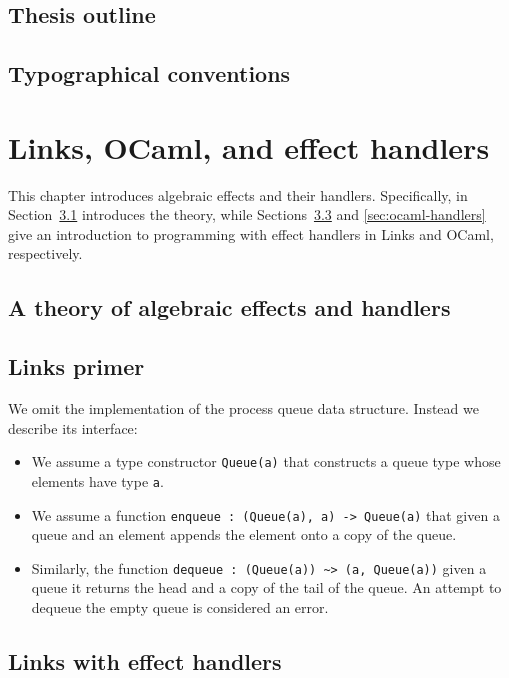 \documentclass[12pt,mscres,cdtppar,twoside,openright,logo,rightchapter,normalheadings]{infthesis}
\theoremstyle{definition}
\begin{document}
\section{Thesis outline}
\section{Typographical conventions}


\chapter{Links, OCaml, and effect handlers}
\label{ch:background}
This chapter introduces algebraic effects and their
handlers. Specifically, in Section~\ref{sec:theory-handlers}
introduces the theory, while Sections~\ref{sec:links-handlers} and
\ref{sec:ocaml-handlers} give an introduction to programming with
effect handlers in Links and OCaml, respectively.

\section{A theory of algebraic effects and handlers}
\label{sec:theory-handlers}

\section{Links primer}
\label{sec:links-primer}

We omit the implementation of the process queue data
structure. Instead we describe its interface:
\begin{itemize}
\item We assume a type constructor \lstinline$Queue(a)$ that
  constructs a queue type whose elements have type \lstinline$a$.
\item We assume a function
  \lstinline$enqueue : (Queue(a), a) -> Queue(a)$ that given a queue
  and an element appends the element onto a copy of the queue.
\item Similarly, the function
  \lstinline$dequeue : (Queue(a)) ~> (a, Queue(a))$ given a queue it
  returns the head and a copy of the tail of the queue. An attempt to
  dequeue the empty queue is considered an error.
\end{itemize}

\section{Links with effect handlers}
\label{sec:links-handlers}
\end{document}
